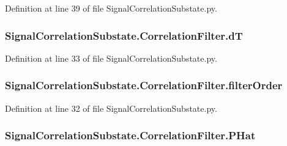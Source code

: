 Definition at line 39 of file Signal\+Correlation\+Substate.\+py.

\subsubsection[{\texorpdfstring{dT}{dT}}]{\setlength{\rightskip}{0pt plus 5cm}Signal\+Correlation\+Substate.\+Correlation\+Filter.\+dT}\hypertarget{classSignalCorrelationSubstate_1_1CorrelationFilter_a500e4823c314d54a21f236b6b896c8eb}{}\label{classSignalCorrelationSubstate_1_1CorrelationFilter_a500e4823c314d54a21f236b6b896c8eb}


Definition at line 33 of file Signal\+Correlation\+Substate.\+py.

\subsubsection[{\texorpdfstring{filter\+Order}{filterOrder}}]{\setlength{\rightskip}{0pt plus 5cm}Signal\+Correlation\+Substate.\+Correlation\+Filter.\+filter\+Order}\hypertarget{classSignalCorrelationSubstate_1_1CorrelationFilter_a4b49b7bd52c1346cca0342942a5bbbb6}{}\label{classSignalCorrelationSubstate_1_1CorrelationFilter_a4b49b7bd52c1346cca0342942a5bbbb6}


Definition at line 32 of file Signal\+Correlation\+Substate.\+py.

\subsubsection[{\texorpdfstring{P\+Hat}{PHat}}]{\setlength{\rightskip}{0pt plus 5cm}Signal\+Correlation\+Substate.\+Correlation\+Filter.\+P\+Hat}\hypertarget{classSignalCorrelationSubstate_1_1CorrelationFilter_a9b079080abde4a661f95687e8ea89827}{}\label{classSignalCorrelationSubstate_1_1CorrelationFilter_a9b079080abde4a661f95687e8ea89827}


